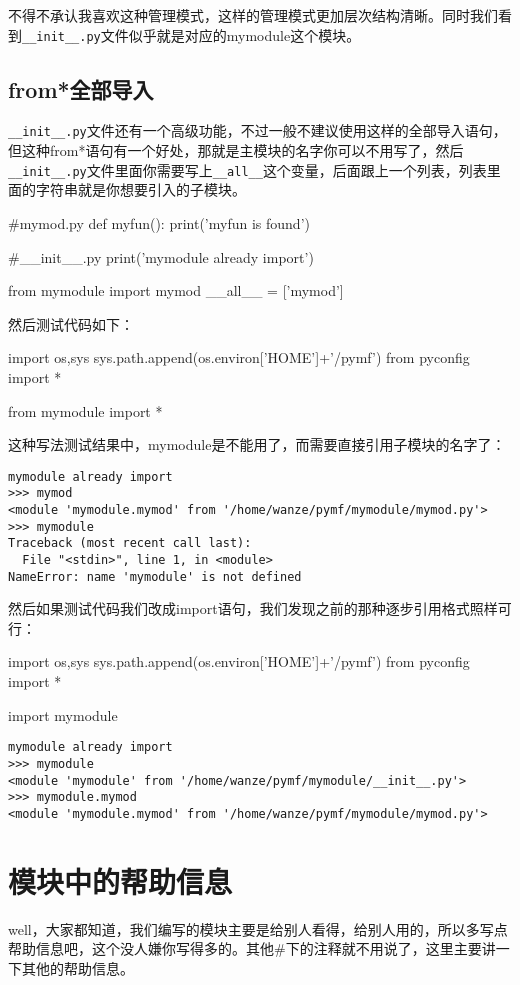 \documentclass[12pt,oneside]{book}
\begin{document}
\begin{common-format}
不得不承认我喜欢这种管理模式，这样的管理模式更加层次结构清晰。同时我们看到\verb+__init__.py+文件似乎就是对应的mymodule这个模块。

\subsection{from*全部导入}
\verb+__init__.py+文件还有一个高级功能，不过一般不建议使用这样的全部导入语句，但这种from*语句有一个好处，那就是主模块的名字你可以不用写了，然后\verb+__init__.py+文件里面你需要写上\verb+__all__+这个变量，后面跟上一个列表，列表里面的字符串就是你想要引入的子模块。

\begin{tcbpython}[]
#mymod.py
def myfun():
    print('myfun is found')
\end{tcbpython}

\begin{tcbpython}[]
#__init__.py
print('mymodule already import')

from mymodule import mymod
__all__ = ['mymod']
\end{tcbpython}
然后测试代码如下：
\begin{tcbpython}
import os,sys
sys.path.append(os.environ['HOME']+'/pymf')
from pyconfig import *

from  mymodule import *
\end{tcbpython}

这种写法测试结果中，mymodule是不能用了，而需要直接引用子模块的名字了：
\begin{Verbatim}
mymodule already import
>>> mymod
<module 'mymodule.mymod' from '/home/wanze/pymf/mymodule/mymod.py'>
>>> mymodule
Traceback (most recent call last):
  File "<stdin>", line 1, in <module>
NameError: name 'mymodule' is not defined
\end{Verbatim}

然后如果测试代码我们改成import语句，我们发现之前的那种逐步引用格式照样可行：
\begin{tcbpython}
import os,sys
sys.path.append(os.environ['HOME']+'/pymf')
from pyconfig import *

import  mymodule 
\end{tcbpython}
\begin{Verbatim}
mymodule already import
>>> mymodule
<module 'mymodule' from '/home/wanze/pymf/mymodule/__init__.py'>
>>> mymodule.mymod
<module 'mymodule.mymod' from '/home/wanze/pymf/mymodule/mymod.py'>
\end{Verbatim}


\section{模块中的帮助信息}
well，大家都知道，我们编写的模块主要是给别人看得，给别人用的，所以多写点帮助信息吧，这个没人嫌你写得多的。其他\#{}下的注释就不用说了，这里主要讲一下其他的帮助信息。


\end{common-format}
\end{document}
